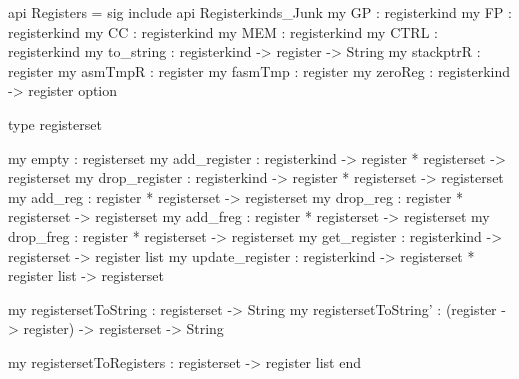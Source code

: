 \begin{SML}
api Registers = sig
   include api Registerkinds_Junk
   my GP   : registerkind 
   my FP   : registerkind
   my CC   : registerkind 
   my MEM  : registerkind 
   my CTRL : registerkind 
   my to_string : registerkind -> register -> String
   my stackptrR : register 
   my asmTmpR : register  
   my fasmTmp : register 
   my zeroReg : registerkind -> register option

   type registerset

   my empty      : registerset
   my add_register    : registerkind -> register * registerset -> registerset
   my drop_register    : registerkind -> register * registerset -> registerset
   my add_reg     : register * registerset -> registerset
   my drop_reg     : register * registerset -> registerset
   my add_freg    : register * registerset -> registerset
   my drop_freg    : register * registerset -> registerset
   my get_register    : registerkind -> registerset -> register list
   my update_register : registerkind -> registerset * register list -> registerset

   my registersetToString : registerset -> String
   my registersetToString' : (register -> register) -> registerset -> String

   my registersetToRegisters : registerset -> register list
end
\end{SML}

